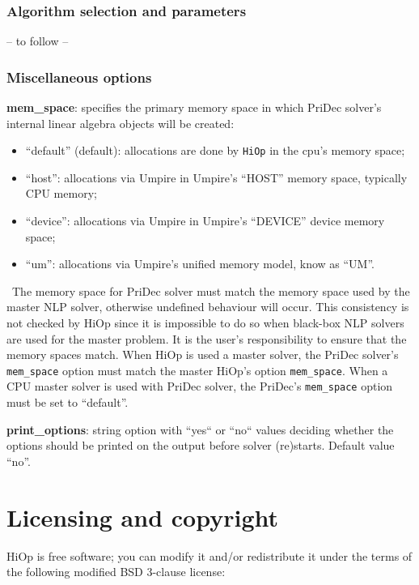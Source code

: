 \documentclass[11pt]{article}
\newcounter{line}
\newcommand{\warningSymbol}{\raisebox{0.9\depth}{\danger}}
\newcommand{\warningcp}[1]{%
        \smallskip \noindent \textcolor{warningColorText}{\warningSymbol{}}\,\textbf{#1} %
    }
\newcommand{\Hi}{\texttt{HiOp}\xspace}
\begin{document}
\subsubsection{Algorithm selection and parameters}

-- to follow --

\subsubsection{Miscellaneous options}


\noindent \textbf{mem\_space}: specifies the primary memory space in which PriDec solver's internal linear algebra objects will be created:
\begin{itemize}
\item ``default'' (default): allocations are done by \Hi in the cpu's memory space;
\item ``host'':  allocations via Umpire in Umpire's ``HOST'' memory space, typically CPU memory;
\item ``device'': allocations via Umpire in Umpire's ``DEVICE'' device memory space;
\item ``um'': allocations via Umpire's unified memory model, know as ``UM''.
\end{itemize}
\warningcp{} The memory space for PriDec solver must match the memory space used by the master NLP solver, otherwise undefined behaviour will occur. This consistency is not checked by HiOp since it is impossible to do so when black-box NLP solvers are used for the master problem. It is the user's responsibility to ensure that the memory spaces match. When HiOp is used a master solver, the PriDec solver's \texttt{mem\_space} option must match the master HiOp's option \texttt{mem\_space}. When a CPU master solver is used with PriDec solver, the PriDec's \texttt{mem\_space} option must be set to ``default''.


\medskip

\noindent \textbf{print\_options}: string option with ``yes`` or ``no`` values deciding whether the options should be printed on the output before solver (re)starts. Default value ``no''.

%

\section{Licensing and copyright}
HiOp is free software; you can modify it and/or redistribute it under the terms of the following  modified BSD 3-clause license:
\end{document}
